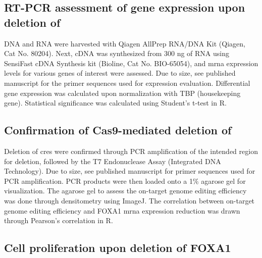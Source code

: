 \subsection{RT-PCR assessment of gene expression upon deletion of }

DNA and RNA were harvested with Qiagen AllPrep RNA/DNA Kit (Qiagen, Cat No. 80204).
Next, cDNA was synthesized from 300 ng of RNA using SensiFast cDNA Synthesis kit (Bioline, Cat No. BIO-65054), and \gls{mrna} expression levels for various genes of interest were assessed.
Due to size, see published manuscript for the primer sequences used for expression evaluation.
Differential gene expression was calculated upon normalization with TBP (housekeeping gene).
Statistical significance was calculated using Student's t-test in R.

\subsection{Confirmation of Cas9-mediated deletion of }

Deletion of \glspl{cre} were confirmed through PCR amplification of the intended region for deletion, followed by the T7 Endonuclease Assay (Integrated DNA Technology).
Due to size, see published manuscript for primer sequences used for PCR amplification.
PCR products were then loaded onto a 1\% agarose gel for visualization.
The agarose gel to assess the on-target genome editing efficiency was done through densitometry using ImageJ.
The correlation between on-target genome editing efficiency and FOXA1 \gls{mrna} expression reduction was drawn through Pearson's correlation in R.

\subsection{Cell proliferation upon deletion of FOXA1 }

